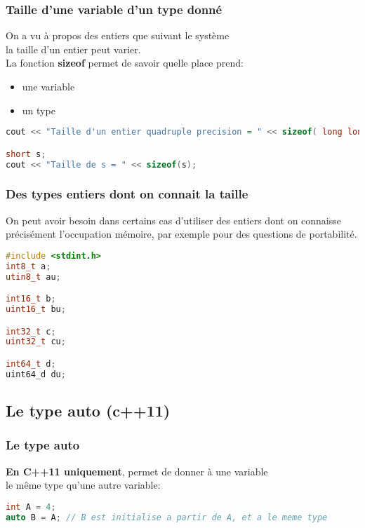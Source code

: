 \documentclass{beamer}
\begin{document}
\begin{frame}[fragile=singleslide,shrink=20]
\frametitle {Taille d'une variable d'un type donné}
On a vu à propos des entiers que suivant le système \\ la taille d'un entier peut varier. \\
La fonction \textbf{sizeof} permet de savoir quelle place prend:
\begin{itemize}
\item{une variable}
\item{un type}
\end{itemize}

\begin{lstlisting}[language=c++]
cout << "Taille d'un entier quadruple precision = " << sizeof( long long int );

short s;
cout << "Taille de s = " << sizeof(s);
\end{lstlisting}
\end{frame}

\begin{frame}[fragile=singleslide,shrink=20]
\frametitle {Des types entiers dont on connait la taille}
On peut avoir besoin dans certains cas d'utiliser des entiers dont on connaisse \\
précisément l'occupation mémoire, par exemple pour des questions de portabilité.
\begin{lstlisting}[language=c++]
#include <stdint.h>
int8_t a;
utin8_t au;

int16_t b;
uint16_t bu;

int32_t c;
uint32_t cu;

int64_t d;
uint64_d du;
\end{lstlisting}
\end{frame}

\subsection{Le type auto (c++11)}

\begin{frame}[fragile=singleslide,shrink=20]
\frametitle{Le type auto}
\textbf{En C++11 uniquement}, permet de donner à une variable \\ 
le même type qu'une autre variable:
\begin{lstlisting}[language=c++]
int A = 4;
auto B = A; // B est initialise a partir de A, et a le meme type
\end{lstlisting}
\end{frame}
\end{document}
